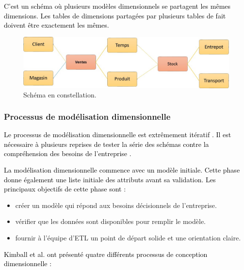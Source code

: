 \documentclass[a4paper,12pt]{report}
\begin{document}
\textcolor{black}{C’est un schéma où plusieurs modèles dimensionnels se partagent les mêmes dimensions. Les tables de dimensions partagées par plusieurs tables de fait doivent être exactement les mêmes. }

\begin{figure}[H]
\begin{center}
\includegraphics[width=0.7\linewidth]{./images/17}
\end{center}

\caption{Schéma en constellation. \citep{group16fg}
}
\label{fig:17}

\end{figure}


\subsubsection{Processus de modélisation dimensionnelle}

\textcolor{black}{Le processus de modélisation dimensionnelle est extrêmement itératif \citep{kimball12data}. Il est nécessaire à plusieurs reprises de tester la série des schémas contre la compréhension des besoins de l'entreprise \cite{kimball04data}.}


\textcolor{black}{La modélisation dimensionnelle commence avec un modèle initiale. Cette phase  donne également une liste initiale des attributs avant sa validation. Les principaux objectifs de cette phase sont \citep{kimball12data}:}

\begin{itemize}
\item	créer un modèle qui répond aux besoins décisionnels de l'entreprise.
\item	vérifier que les données sont disponibles pour remplir le modèle.
\item	fournir à l'équipe d'ETL un point de départ solide et une orientation claire.

\end{itemize}

\textcolor{black}{Kimball et al. ont présenté quatre différents processus de conception dimensionnelle \citep{kimball2008data}:}
\end{document}
